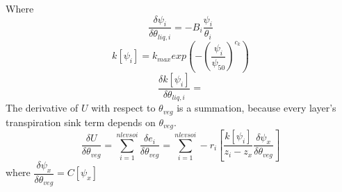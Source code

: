 \documentclass[11pt, oneside]{article}   	%
\begin{document}
Where
\begin{equation}
\dfrac{\delta \psi_i}{\delta \theta_{liq,i}} = -B_i \dfrac{\psi_i}{\theta_i}
\end{equation}
\begin{equation}
k\left[\psi_i\right] = k_{max}exp\left(-\left(\dfrac{\psi_i}{\psi_{50}}\right)^{c_k}\right)
\end{equation}
\begin{equation}
\dfrac{\delta k \left[ \psi_i \right]}{\delta \theta_{liq,i}} =
\end{equation}
The derivative of $U$ with respect to $\theta_{veg}$ is a summation, because every layer's transpiration sink term depends on $\theta_{veg}$.
\begin{equation}
\dfrac{\delta U}{\delta \theta_{veg}}=\sum\limits_{i=1}^{nlevsoi}\dfrac{\delta e_i}{\delta\theta_{veg}}=\sum\limits_{i=1}^{nlevsoi}-r_{i}\left[\dfrac{k\left[\psi_i\right]}{z_i-z_x}\dfrac{\delta \psi_x}{\delta \theta_{veg}}\right]
\end{equation}
where $\dfrac{\delta \psi_{x}}{\delta \theta_{veg}} = C\left[\psi_x\right]$
\end{document}
